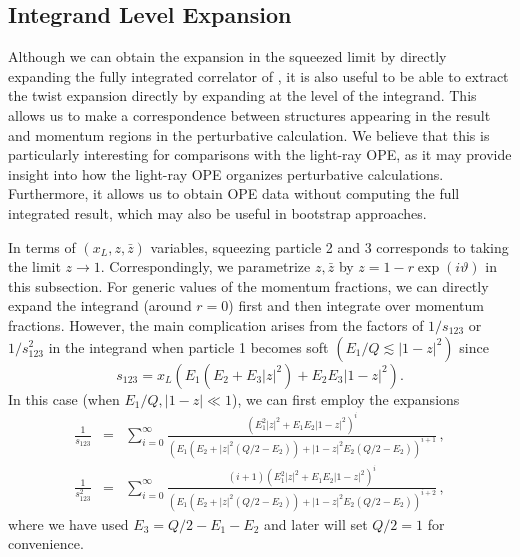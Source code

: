 \documentclass[letterpaper,11pt]{article}
\def\beq{\begin{equation}}
\def\eeq{\end{equation}}
\def\bea{\begin{eqnarray}}
\def\eea{\end{eqnarray}}
\newcommand{\abs}[1]{\lvert#1\rvert}
\def\beq{\begin{equation}}
\def\eeq{\end{equation}}
\begin{document}
\subsection{Integrand Level Expansion}\label{sec:expansion}

Although we can obtain the expansion in the squeezed limit by directly expanding the fully integrated correlator of \cite{Chen:2019bpb}, it is also useful to be able to extract the twist expansion directly by expanding at the level of the integrand. This allows us to make a correspondence between structures appearing in the result and momentum regions in the perturbative calculation. We believe that this is particularly interesting for comparisons with the light-ray OPE, as it may provide insight into how the light-ray OPE organizes perturbative calculations. Furthermore, it allows us to obtain OPE data without computing the full integrated result, which may also be useful in bootstrap approaches.


In terms of $(x_L,z,\bar{z})$ variables, squeezing particle 2 and 3 corresponds to taking the limit $z\to1$. Correspondingly, we parametrize $z,\bar{z}$ by $z=1-r \exp(i \vartheta)$ in this subsection. For generic values of the momentum fractions, we can directly expand the integrand (around $r=0$) first and then integrate over momentum fractions.  However, the main complication arises from the factors of $1/s_{123}$ or $1/s_{123}^2$ in the integrand when particle 1 becomes soft $(E_1/Q\lesssim\abs{1-z}^2)$ since
\beq
s_{123}=x_L\left( E_1\left( E_2+ E_3 \abs{z}^2\right)+E_2 E_3 \abs{1-z}^2 \right).
\eeq
In this case (when $E_1/Q,\abs{1-z}\ll 1$), we can first employ the expansions
\bea
\frac{1}{s_{123}}&=&\sum_{i=0}^{\infty} \frac{\left(E_1^2 \abs{z}^2+E_1 E_2\abs{1-z}^2\right)^i}{(E_1(E_2+\abs{z}^2(Q/2-E_2))+\abs{1-z}^2 E_2(Q/2-E_2))^{i+1}}\,,\\
\frac{1}{s_{123}^2}&=&\sum_{i=0}^{\infty} \frac{(i+1)\left(E_1^2 \abs{z}^2+E_1 E_2\abs{1-z}^2\right)^i}{(E_1(E_2+\abs{z}^2(Q/2-E_2))+\abs{1-z}^2 E_2(Q/2-E_2))^{i+2}}\,, \label{eq: soft_end_exp}
\eea
where we have used $E_3=Q/2-E_1-E_2$ and later will set $Q/2=1$ for convenience. 
\end{document}
